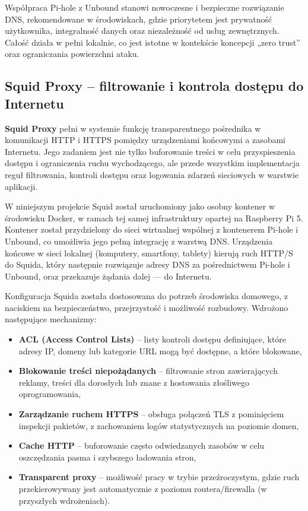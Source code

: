 \documentclass[
    left=2.5cm,         %
    right=2.5cm,        %
    top=2.5cm,          %
    bottom=3cm,         %
    bindingoffset=6mm,  %
    nohyphenation=true %
]{eiti/eiti-thesis} %
\begin{document}
Współpraca Pi-hole z Unbound stanowi nowoczesne i bezpieczne rozwiązanie DNS, rekomendowane w środowiskach, gdzie priorytetem jest prywatność użytkownika, integralność danych oraz niezależność od usług zewnętrznych. Całość działa w pełni lokalnie, co jest istotne w kontekście koncepcji „zero trust” oraz ograniczania powierzchni ataku.

\subsection{Squid Proxy – filtrowanie i kontrola dostępu do Internetu}

\textbf{Squid Proxy} pełni w systemie funkcję transparentnego pośrednika w komunikacji HTTP i HTTPS pomiędzy urządzeniami końcowymi a zasobami Internetu. Jego zadaniem jest nie tylko buforowanie treści w celu przyspieszenia dostępu i ograniczenia ruchu wychodzącego, ale przede wszystkim implementacja reguł filtrowania, kontroli dostępu oraz logowania zdarzeń sieciowych w warstwie aplikacji.

W niniejszym projekcie Squid został uruchomiony jako osobny kontener w środowisku Docker, w ramach tej samej infrastruktury opartej na Raspberry Pi 5. Kontener został przydzielony do sieci wirtualnej wspólnej z kontenerem Pi-hole i Unbound, co umożliwia jego pełną integrację z warstwą DNS. Urządzenia końcowe w sieci lokalnej (komputery, smartfony, tablety) kierują ruch HTTP/S do Squida, który następnie rozwiązuje adresy DNS za pośrednictwem Pi-hole i Unbound, oraz przekazuje żądania dalej — do Internetu.

Konfiguracja Squida została dostosowana do potrzeb środowiska domowego, z naciskiem na bezpieczeństwo, przejrzystość i możliwość rozbudowy. Wdrożono następujące mechanizmy:
\begin{itemize}
    \item \textbf{ACL (Access Control Lists)} – listy kontroli dostępu definiujące, które adresy IP, domeny lub kategorie URL mogą być dostępne, a które blokowane,
    \item \textbf{Blokowanie treści niepożądanych} – filtrowanie stron zawierających reklamy, treści dla dorosłych lub znane z hostowania złośliwego oprogramowania,
    \item \textbf{Zarządzanie ruchem HTTPS} – obsługa połączeń TLS z pominięciem inspekcji pakietów, z zachowaniem logów statystycznych na poziomie domen,
    \item \textbf{Cache HTTP} – buforowanie często odwiedzanych zasobów w celu oszczędzania pasma i szybszego ładowania stron,
    \item \textbf{Transparent proxy} – możliwość pracy w trybie przeźroczystym, gdzie ruch przekierowywany jest automatycznie z poziomu routera/firewalla (w przyszłych wdrożeniach).
\end{itemize}
\end{document}
